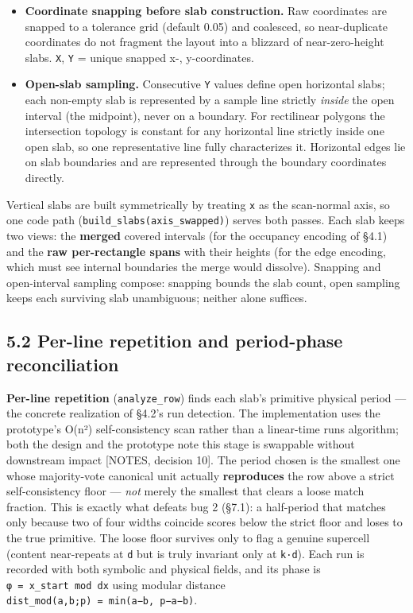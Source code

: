 \documentclass[
  11pt,
]{article}
\providecommand{\tightlist}{%
  \setlength{\itemsep}{0pt}\setlength{\parskip}{0pt}}
\begin{document}
\begin{itemize}
\tightlist
\item
  \textbf{Coordinate snapping before slab construction.} Raw coordinates
  are snapped to a tolerance grid (default 0.05) and coalesced, so
  near-duplicate coordinates do not fragment the layout into a blizzard
  of near-zero-height slabs. \texttt{X}, \texttt{Y} = unique snapped x-,
  y-coordinates.
\item
  \textbf{Open-slab sampling.} Consecutive \texttt{Y} values define open
  horizontal slabs; each non-empty slab is represented by a sample line
  strictly \emph{inside} the open interval (the midpoint), never on a
  boundary. For rectilinear polygons the intersection topology is
  constant for any horizontal line strictly inside one open slab, so one
  representative line fully characterizes it. Horizontal edges lie on
  slab boundaries and are represented through the boundary coordinates
  directly.
\end{itemize}

Vertical slabs are built symmetrically by treating \texttt{x} as the
scan-normal axis, so one code path
(\texttt{build\_slabs(axis\_swapped)}) serves both passes. Each slab
keeps two views: the \textbf{merged} covered intervals (for the
occupancy encoding of §4.1) and the \textbf{raw per-rectangle spans}
with their heights (for the edge encoding, which must see internal
boundaries the merge would dissolve). Snapping and open-interval
sampling compose: snapping bounds the slab count, open sampling keeps
each surviving slab unambiguous; neither alone suffices.

\subsection{5.2 Per-line repetition and period-phase
reconciliation}\label{per-line-repetition-and-period-phase-reconciliation}

\textbf{Per-line repetition} (\texttt{analyze\_row}) finds each slab's
primitive physical period --- the concrete realization of §4.2's run
detection. The implementation uses the prototype's O(n²)
self-consistency scan rather than a linear-time runs algorithm; both the
design and the prototype note this stage is swappable without downstream
impact {[}NOTES, decision 10{]}. The period chosen is the smallest one
whose majority-vote canonical unit actually \textbf{reproduces} the row
above a strict self-consistency floor --- \emph{not} merely the smallest
that clears a loose match fraction. This is exactly what defeats bug 2
(§7.1): a half-period that matches only because two of four widths
coincide scores below the strict floor and loses to the true primitive.
The loose floor survives only to flag a genuine supercell (content
near-repeats at \texttt{d} but is truly invariant only at \texttt{k·d}).
Each run is recorded with both symbolic and physical fields, and its
phase is \texttt{φ\ =\ x\_start\ mod\ dx} using modular distance
\texttt{dist\_mod(a,b;p)\ =\ min(\textbar{}a−b\textbar{},\ p−\textbar{}a−b\textbar{})}.
\end{document}
